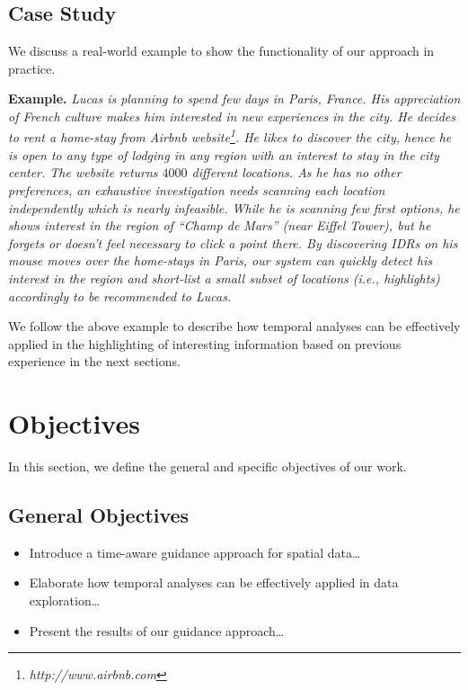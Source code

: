 
\subsection{Case Study}

We discuss a real-world example to show the functionality of our approach in practice.

{\bf Example.} {\em Lucas is planning to spend few days in Paris, France. His appreciation of French culture makes him interested in new experiences in the city. He decides to rent a home-stay from Airbnb website\footnote{\it http://www.airbnb.com}. He likes to discover the city, hence he is open to any type of lodging in any region with an interest to stay in the city center. The website returns $4000$ different locations. As he has no other preferences, an exhaustive investigation needs scanning each location independently which is nearly infeasible. While he is scanning few first options, he shows interest in the region of ``Champ de Mars'' (near Eiffel Tower), but he forgets or doesn't feel necessary to click a point there. By discovering IDRs on his mouse moves over the home-stays in Paris, our system can quickly detect his interest in the region and short-list a small subset of locations (i.e., highlights) accordingly to be recommended to Lucas.}


We follow the above example to describe how temporal analyses can be effectively
applied in the highlighting of interesting information based on previous experience
in the next sections.

\section{Objectives}

In this section, we define the general and specific objectives of our work.

\subsection{General Objectives}

\begin{itemize}
	\item Introduce a time-aware guidance approach for spatial data\ldots
	\item Elaborate how temporal analyses can be effectively applied in data exploration\ldots
	\item Present the results of our guidance approach\ldots
\end{itemize}

